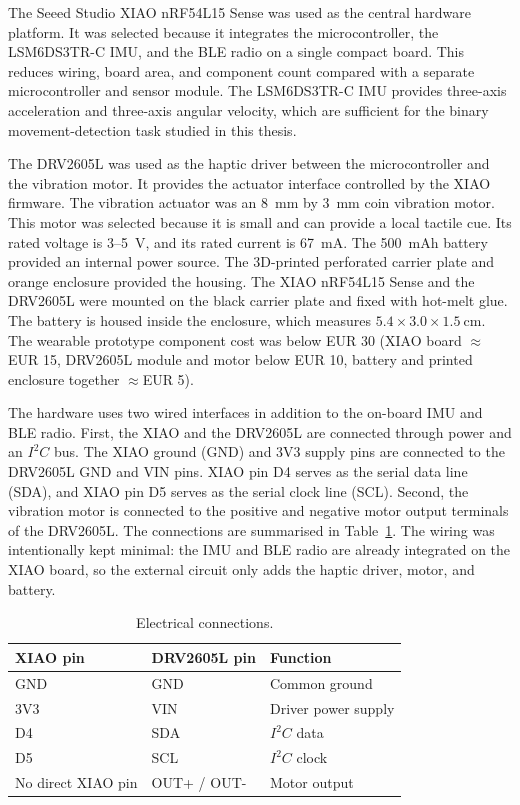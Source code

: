 The Seeed Studio XIAO nRF54L15 Sense was used as the central hardware platform. It was selected because it integrates the microcontroller, the LSM6DS3TR-C IMU, and the BLE radio on a single compact board. This reduces wiring, board area, and component count compared with a separate microcontroller and sensor module. The LSM6DS3TR-C IMU provides three-axis acceleration and three-axis angular velocity, which are sufficient for the binary movement-detection task studied in this thesis.

The DRV2605L was used as the haptic driver between the microcontroller and the vibration motor. It provides the actuator interface controlled by the XIAO firmware. The vibration actuator was an 8~mm by 3~mm coin vibration motor. This motor was selected because it is small and can provide a local tactile cue. Its rated voltage is 3--5~V, and its rated current is 67~mA. The 500~mAh battery provided an internal power source. The 3D-printed perforated carrier plate and orange enclosure provided the housing. The XIAO nRF54L15 Sense and the DRV2605L were mounted on the black carrier plate and fixed with hot-melt glue. The battery is housed inside the enclosure, which measures \(5.4 \times 3.0 \times 1.5~\mathrm{cm}\). The wearable prototype component cost was below EUR 30 (XIAO board $\approx$EUR 15, DRV2605L module and motor below EUR 10, battery and printed enclosure together $\approx$EUR 5).

The hardware uses two wired interfaces in addition to the on-board IMU and BLE radio. First, the XIAO and the DRV2605L are connected through power and an \(I^2C\) bus. The XIAO ground (GND) and 3V3 supply pins are connected to the DRV2605L GND and VIN pins. XIAO pin D4 serves as the serial data line (SDA), and XIAO pin D5 serves as the serial clock line (SCL). Second, the vibration motor is connected to the positive and negative motor output terminals of the DRV2605L. The connections are summarised in Table~\ref{tab:electrical_connections}. The wiring was intentionally kept minimal: the IMU and BLE radio are already integrated on the XIAO board, so the external circuit only adds the haptic driver, motor, and battery.

\begin{table}[!htbp]
    \centering
    \footnotesize
    \caption{Electrical connections.}
    \label{tab:electrical_connections}
    \begin{tabular*}{\linewidth}{@{\extracolsep{\fill}}lll@{}}
        \toprule
        XIAO pin & DRV2605L pin & Function \\
        \midrule
        GND & GND & Common ground \\
        3V3 & VIN & Driver power supply \\
        D4 & SDA & \(I^2C\) data \\
        D5 & SCL & \(I^2C\) clock \\
        No direct XIAO pin & OUT+ / OUT- & Motor output \\
        \bottomrule
    \end{tabular*}
\end{table}

